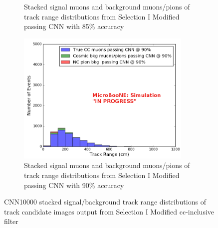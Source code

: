 \begin{figure}[htp!]
\begin{subfigure}[b]{.45\textwidth}
	\caption{Stacked signal muons and background muons/pions of track range distributions from Selection I Modified passing CNN with 85\% accuracy}
	\label{fig:sel1mod_mupi_85stackedcnn}
	\end{subfigure}
	\quad
	\begin{subfigure}[b]{.45\textwidth}
	\includegraphics[width=\textwidth, height=2.5in]{figs/sel1mod_cnn_trackrange_acc90_0707.png}
	\caption{Stacked signal muons and background muons/pions of track range distributions from Selection I Modified passing CNN with 90\% accuracy}
	\label{fig:sel1mod_mupi_90stackedcnn}
	\end{subfigure}
	\quad
\caption{CNN10000 stacked signal/background track range distributions of track candidate images output from Selection I Modified cc-inclusive filter}
\label{fig:sel1modCNNdistacc}
\end{figure}


